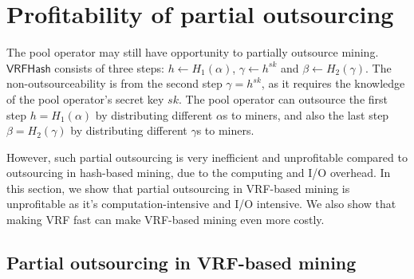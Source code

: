\section{Profitability of partial outsourcing}
\label{sec:partial-outsourcing}

The pool operator may still have opportunity to partially outsource mining.
$\mathsf{VRFHash}$ consists of three steps: $h \gets H_1(\alpha)$, $\gamma \gets h^{sk}$ and $\beta \gets H_2(\gamma)$.
The non-outsourceability is from the second step $\gamma = h^{sk}$, as it requires the knowledge of the pool operator's secret key $sk$.
The pool operator can outsource the first step $h = H_1(\alpha)$ by distributing different $\alpha$s to miners, and also the last step $\beta = H_2(\gamma)$ by distributing different $\gamma$s to miners.

However, such partial outsourcing is very inefficient and unprofitable compared to outsourcing in hash-based mining, due to the computing and I/O overhead.
In this section, we show that partial outsourcing in VRF-based mining is unprofitable as it's computation-intensive and I/O intensive.
We also show that making VRF fast can make VRF-based mining even more costly.

\subsection{Partial outsourcing in VRF-based mining}

